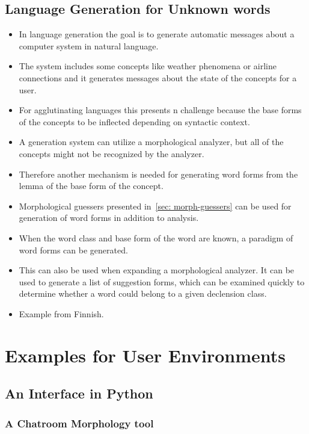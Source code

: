 \documentclass{llncs}
\begin{document}
\subsection{Language Generation for Unknown words}
\begin{itemize}
\item In language generation the goal is to generate automatic
  messages about a computer system in natural language.
\item The system includes some concepts like weather phenomena or
  airline connections and it generates messages about the state of the
  concepts for a user.
\item For agglutinating languages this presents n challenge because
  the base forms of the concepts to be inflected depending on syntactic
  context.
\item A generation system can utilize a morphological analyzer, but
  all of the concepts might not be recognized by the analyzer.
\item Therefore another mechanism is needed for generating word forms
  from the lemma of the base form of the concept.
\item Morphological guessers presented in~\ref{sec: morph-guessers}
  can be used for generation of word forms in addition to analysis.
\item When the word class and base form of the word are known, a
  paradigm of word forms can be generated.
\item This can also be used when expanding a morphological
  analyzer. It can be used to generate a list of suggestion forms,
  which can be examined quickly to determine whether a word could
  belong to a given declension class.
\item Example from Finnish.
\end{itemize}

\section{Examples for User Environments}

\subsection{An Interface in Python}

\subsubsection{A Chatroom Morphology tool}
\end{document}
